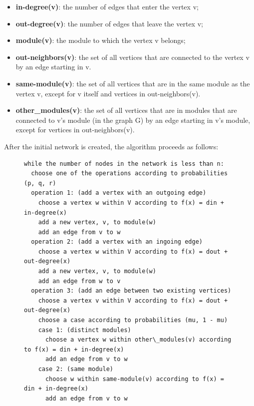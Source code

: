 \begin{itemize}

\item \textbf{in-degree(v)}: the number of edges that enter the vertex v;

\item \textbf{out-degree(v)}: the number of edges that leave the vertex v;

\item \textbf{module(v)}: the module to which the vertex v belongs;

\item \textbf{out-neighbors(v)}: the set of all vertices that are connected to
the vertex v by an edge starting in v.

\item \textbf{same-module(v)}: the set of all vertices that are in the same
module as the vertex v, except for v itself and vertices in out-neighbors(v).

\item \textbf{other\_modules(v)}: the set of all vertices that are in modules
that are connected to v's module (in the graph G) by an edge starting in v's
module, except for vertices in out-neighbors(v).

\end{itemize}

After the initial network is created, the algorithm proceeds as follows:

\begin{figure}
\begin{verbatim}
while the number of nodes in the network is less than n:
  choose one of the operations according to probabilities (p, q, r)
  operation 1: (add a vertex with an outgoing edge)
    choose a vertex w within V according to f(x) = din + in-degree(x)
    add a new vertex, v, to module(w)
    add an edge from v to w
  operation 2: (add a vertex with an ingoing edge)
    choose a vertex w within V according to f(x) = dout + out-degree(x)
    add a new vertex, v, to module(w)
    add an edge from w to v
  operation 3: (add an edge between two existing vertices)
    choose a vertex v within V according to f(x) = dout + out-degree(x)
    choose a case according to probabilities (mu, 1 - mu)
    case 1: (distinct modules)
  	  choose a vertex w within other\_modules(v) according to f(x) = din + in-degree(x)
      add an edge from v to w
    case 2: (same module)
      choose w within same-module(v) according to f(x) = din + in-degree(x)
      add an edge from v to w
\end{verbatim}
\end{figure}

